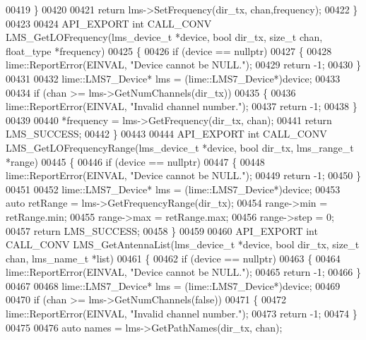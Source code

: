 \begin{DoxyCode}
00419     \}
00420 
00421     \textcolor{keywordflow}{return} lms->SetFrequency(dir\_tx, chan,frequency);
00422 \}
00423 
00424 API_EXPORT \textcolor{keywordtype}{int} CALL_CONV LMS_GetLOFrequency(lms_device_t *device, \textcolor{keywordtype}{bool} dir_tx, \textcolor{keywordtype}{size\_t} 
      chan, float_type *frequency)
00425 \{
00426     \textcolor{keywordflow}{if} (device == \textcolor{keyword}{nullptr})
00427     \{
00428         lime::ReportError(EINVAL, \textcolor{stringliteral}{"Device cannot be NULL."});
00429         \textcolor{keywordflow}{return} -1;
00430     \}
00431 
00432     lime::LMS7_Device* lms = (lime::LMS7_Device*)device;
00433 
00434     \textcolor{keywordflow}{if} (chan >= lms->GetNumChannels(dir\_tx))
00435     \{
00436         lime::ReportError(EINVAL, \textcolor{stringliteral}{"Invalid channel number."});
00437         \textcolor{keywordflow}{return} -1;
00438     \}
00439 
00440     *frequency = lms->GetFrequency(dir\_tx, chan);
00441     \textcolor{keywordflow}{return} LMS_SUCCESS;
00442 \}
00443 
00444 API_EXPORT \textcolor{keywordtype}{int} CALL_CONV LMS_GetLOFrequencyRange(lms_device_t *device, \textcolor{keywordtype}{bool} 
      dir_tx, lms_range_t *range)
00445 \{
00446     \textcolor{keywordflow}{if} (device == \textcolor{keyword}{nullptr})
00447     \{
00448         lime::ReportError(EINVAL, \textcolor{stringliteral}{"Device cannot be NULL."});
00449         \textcolor{keywordflow}{return} -1;
00450     \}
00451 
00452     lime::LMS7_Device* lms = (lime::LMS7_Device*)device;
00453     \textcolor{keyword}{auto} retRange = lms->GetFrequencyRange(dir\_tx);
00454     range->min = retRange.min;
00455     range->max = retRange.max;
00456     range->step = 0;
00457     \textcolor{keywordflow}{return} LMS_SUCCESS;
00458 \}
00459 
00460 API_EXPORT \textcolor{keywordtype}{int} CALL_CONV LMS_GetAntennaList(lms_device_t *device, \textcolor{keywordtype}{bool} dir_tx, \textcolor{keywordtype}{size\_t} 
      chan, lms_name_t *list)
00461 \{
00462     \textcolor{keywordflow}{if} (device == \textcolor{keyword}{nullptr})
00463     \{
00464         lime::ReportError(EINVAL, \textcolor{stringliteral}{"Device cannot be NULL."});
00465         \textcolor{keywordflow}{return} -1;
00466     \}
00467 
00468     lime::LMS7_Device* lms = (lime::LMS7_Device*)device;
00469 
00470     \textcolor{keywordflow}{if} (chan >= lms->GetNumChannels(\textcolor{keyword}{false}))
00471     \{
00472         lime::ReportError(EINVAL, \textcolor{stringliteral}{"Invalid channel number."});
00473         \textcolor{keywordflow}{return} -1;
00474     \}
00475 
00476     \textcolor{keyword}{auto} names = lms->GetPathNames(dir\_tx, chan);

\end{DoxyCode}
